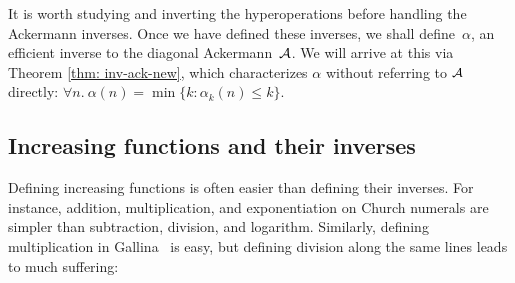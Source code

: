 It is worth studying and inverting the hyperoperations before handling the Ackermann inverses.
Once we have defined these inverses, we shall define~$\alpha$, an efficient inverse to the diagonal Ackermann~$\mathcal{A}$. We will arrive at this via Theorem \ref{thm: inv-ack-new},
which characterizes $\alpha$ without referring to $\mathcal{A}$ directly:
$
\forall n.~ \alpha(n) = \min\big\{k : \alpha_k(n)\le k \big\}
$.





\subsection{Increasing functions and their inverses}
\label{sec:incfuncinv}
Defining increasing functions is often easier than defining their inverses.
For instance, addition, multiplication, and exponentiation on Church numerals
are simpler than subtraction, division, and logarithm. Similarly, defining multiplication in Gallina~\cite{coq} is easy, but defining division along the same lines leads to much suffering:

